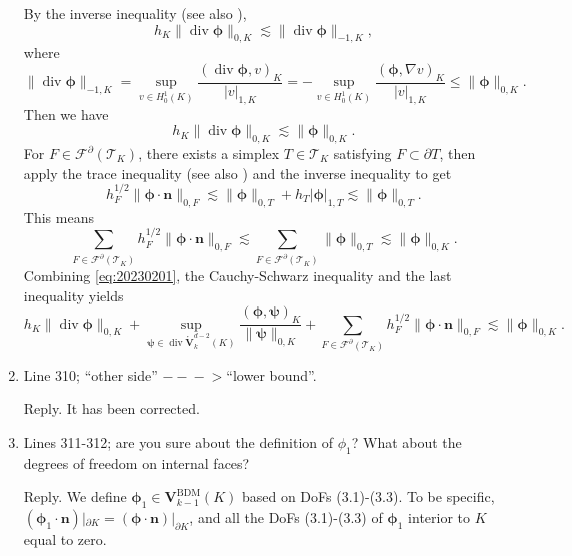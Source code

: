 \documentclass[10pt]{amsart}
\theoremstyle{definition}
\theoremstyle{remark}
\renewcommand{\div}{\operatorname{div}}
\begin{document}
\begin{enumerate}[1.]
By the inverse inequality \cite{Ciarlet1978,Verfuerth2013} (see also \cite[Lemma 10]{Huang2020}),
$$
h_K\|\div\boldsymbol{\phi}\|_{0,K}\lesssim  \|\div\boldsymbol{\phi}\|_{-1,K},
$$ 
where
$$
\|\div\boldsymbol{\phi}\|_{-1,K}=\sup_{v\in H_0^1(K)}\frac{(\div\boldsymbol{\phi}, v)_K}{|v|_{1,K}}=-\sup_{v\in H_0^1(K)}\frac{(\boldsymbol{\phi}, \nabla v)_K}{|v|_{1,K}} \leq \|\boldsymbol{\phi}\|_{0,K}.
$$
Then we have
\begin{equation}\label{eq:20230201}  
h_K\|\div\boldsymbol{\phi}\|_{0,K}\lesssim \|\boldsymbol{\phi}\|_{0,K}.
\end{equation}
For $F\in\mathcal F^{\partial}(\mathcal T_K)$, there exists a simplex $T\in\mathcal T_K$ satisfying $F\subset\partial T$, then apply the trace inequality \cite[Theorem 1.5.1.10]{Grisvard1985} (see also \cite[(2.18)]{BrennerSung2018}) and the inverse inequality to get
$$
h_F^{1/2}\|\boldsymbol{\phi}\cdot\boldsymbol{n}\|_{0,F} \lesssim \|\boldsymbol{\phi}\|_{0,T}+h_T|\boldsymbol{\phi}|_{1,T}\lesssim \|\boldsymbol{\phi}\|_{0,T}.
$$ 
This means
$$
\sum_{F\in\mathcal F^{\partial}(\mathcal T_K)}h_F^{1/2}\|\boldsymbol{\phi}\cdot\boldsymbol{n}\|_{0,F} \lesssim \sum_{F\in\mathcal F^{\partial}(\mathcal T_K)}\|\boldsymbol{\phi}\|_{0,T}\lesssim \|\boldsymbol{\phi}\|_{0,K}.
$$ 
Combining \eqref{eq:20230201}, the Cauchy-Schwarz inequality and the last inequality yields
$$
h_K\|\div\boldsymbol{\phi}\|_{0,K}+\sup_{\boldsymbol{\psi}\in\div\mathring{\boldsymbol{V}}_{k}^{d-2}(K)}\frac{(\boldsymbol{\phi}, \boldsymbol{\psi})_K}{\|\boldsymbol{\psi}\|_{0,K}} +\sum_{F\in\mathcal F^{\partial}(\mathcal T_K)}h_F^{1/2}\|\boldsymbol{\phi}\cdot\boldsymbol{n}\|_{0,F}\lesssim \|\boldsymbol{\phi}\|_{0,K}.
$$

\medskip

\item \textsf{Line 310; “other side” $-\!\!\!-\!\!\!-\!\!\!>$“lower bound”.}

\smallskip \noindent \textcolor[rgb]{1.00,0.00,0.00}{Reply.}
It has been corrected.

\medskip

\item \textsf{Lines 311-312; are you sure about the definition of $\phi_1$? What about the degrees of freedom on internal faces?}

\smallskip \noindent \textcolor[rgb]{1.00,0.00,0.00}{Reply.}
We define $\boldsymbol{\phi}_1\in\boldsymbol{V}_{k-1}^{\mathrm{BDM}}(K)$ based on DoFs (3.1)-(3.3).
To be specific, $(\boldsymbol{\phi}_1\cdot\boldsymbol{n})|_{\partial K}=(\boldsymbol{\phi}\cdot\boldsymbol{n})|_{\partial K}$, and all the DoFs (3.1)-(3.3) of $\boldsymbol{\phi}_1$ interior to $K$ equal to zero.


\end{enumerate}
\end{document}
